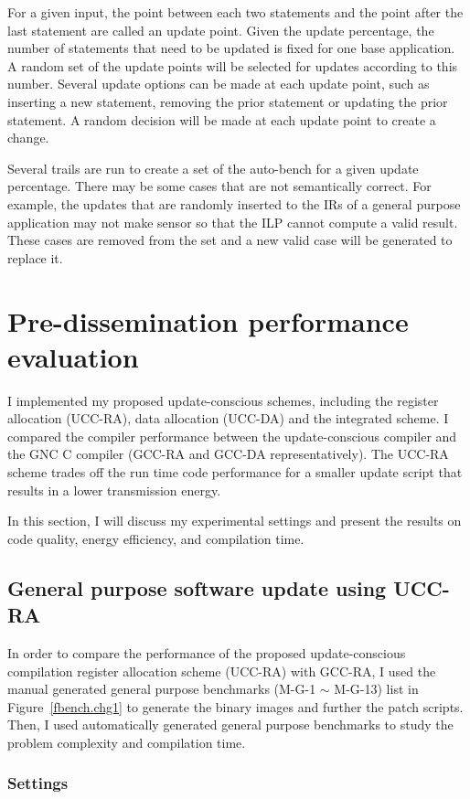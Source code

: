 For a given input, the point between each two statements and the point after the last statement are called an update point.
Given the update percentage, the number of statements that need to be updated is fixed
for one base application.
A random set of the update points will be selected for updates according to this number.
Several update options can be made at each update point, such as inserting a new statement,
removing the prior statement or updating the prior statement.
A random decision will be made at each update point to create a change.

Several trails are run to create a set of the auto-bench for a given update percentage.
There may be some cases that are not semantically correct.
For example, the updates that are randomly inserted to the IRs of a general purpose
application may not make sensor so that the ILP cannot compute a valid result.
These cases are removed from the set and a new valid case will be generated to replace it.

\section{Pre-dissemination performance evaluation}
I implemented my proposed update-conscious schemes, including the register allocation
(UCC-RA), data allocation (UCC-DA) and the integrated scheme.
I compared the compiler performance between the update-conscious compiler and 
the GNC C compiler (GCC-RA and GCC-DA representatively). 
The UCC-RA scheme trades off the run time code performance for a smaller update script
that results in a lower transmission energy.

In this
section, I will discuss my experimental settings and present the results
on code quality, energy efficiency, and compilation time.

\subsection{General purpose software update using UCC-RA}\label{exper-ra}

In order to compare the performance of the proposed update-conscious compilation register
allocation scheme (UCC-RA) with GCC-RA, I used the manual generated general purpose 
benchmarks (M-G-1 $\sim$ M-G-13) list in
Figure~\ref{fbench.chg1} to generate the binary images and further the patch scripts.
Then, I used automatically generated general purpose benchmarks to study the
problem complexity and compilation time.
\subsubsection{Settings}

